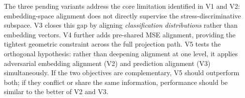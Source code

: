 \documentclass[sigconf,anonymous=false]{acmart}
\begin{document}
The three pending variants address the core limitation identified in V1 and V2:
embedding-space alignment does not directly supervise the stress-discriminative
subspace.  V3 closes this gap by aligning \emph{classification distributions}
rather than embedding vectors.  V4 further adds pre-shared MSE alignment,
providing the tightest geometric constraint across the full projection path.
V5 tests the orthogonal hypothesis: rather than deepening alignment at one
level, it applies adversarial embedding alignment (V2) and prediction
alignment (V3) simultaneously.  If the two objectives are complementary,
V5 should outperform both; if they conflict or share the same information,
performance should be similar to the better of V2 and V3.
\end{document}
